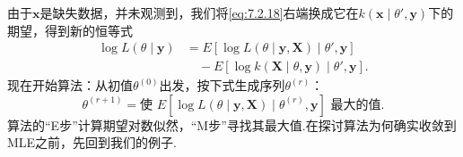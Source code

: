 由于$\boldsymbol x$是缺失数据，并未观测到，我们将\eqref{eq:7.2.18}右端换成它在$k(\boldsymbol x\mid\theta',\boldsymbol y)$下的期望，得到新的恒等式
\begin{equation}\label{eq:7.2.19}
\begin{aligned}
\log L(\theta\mid\boldsymbol y)
&=E[\log L(\theta\mid\boldsymbol y,\boldsymbol X)\mid\theta',\boldsymbol y]\\
&\quad-E[\log k(\boldsymbol X\mid\theta,\boldsymbol y)\mid\theta',\boldsymbol y].
\end{aligned}
\end{equation}
现在开始算法：从初值$\theta^{(0)}$出发，按下式生成序列$\theta^{(r)}$：
\begin{equation}\label{eq:7.2.20}
\theta^{(r+1)}=\text{使 }E[\log L(\theta\mid\boldsymbol y,\boldsymbol X)\mid\theta^{(r)},\boldsymbol y]\text{ 最大的值}.
\end{equation}
算法的“E步”计算期望对数似然，“M步”寻找其最大值.在探讨算法为何确实收敛到MLE之前，先回到我们的例子.

